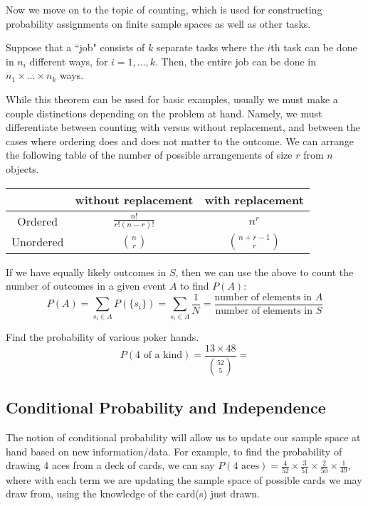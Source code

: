Now we move on to the topic of counting, which is used for constructing probability assignments on finite sample spaces as well as other tasks.

\begin{theorem}
    Suppose that a ``job" consists of $k$ separate tasks where the $i$th task can be done in $n_i$ different ways, for $i = 1, \dots, k$. Then, the entire job can be done in $n_1 \times \dots \times n_k$ ways.
\end{theorem}

While this theorem can be used for basic examples, usually we must make a couple distinctions depending on the problem at hand. Namely, we must differentiate between counting with versus without replacement, and between the cases where ordering does and does not matter to the outcome. We can arrange the following table of the number of possible arrangements of size $r$ from $n$ objects.
\begin{center}
\begin{tabular}{c|c|c}
 & without replacement & with replacement \\
\hline
Ordered & $\frac{n!}{r!(n-r)!}$ & $n^r$ \\
\hline
Unordered & $\binom{n}{r}$ & $\binom{n+r-1}{r}$ \\
\end{tabular}
\end{center}
\nextp

If we have equally likely outcomes in $S$, then we can use the above to count the number of outcomes in a given event $A$ to find $P(A)$:
\[
P(A) = \sum_{s_i \in A}{P(\{s_i\})} = \sum_{s_i \in A}{\frac{1}{N}} = \frac{\text{number of elements in } A}{\text{number of elements in } S}
\]

\begin{example}
    Find the probability of various poker hands.
    \[
    P(\text{4 of a kind}) = \frac{13 \times 48}{\binom{52}{5}} = 
    \]
\end{example}
\bigskip


\subsection*{Conditional Probability and Independence}
The notion of conditional probability will allow us to update our sample space at hand based on new information/data. For example, to find the probability of drawing 4 aces from a deck of cards, we can say $P(4 \text{ aces}) = \frac{4}{52} \times \frac{3}{51} \times \frac{2}{50} \times \frac{1}{49}$, where with each term we are updating the sample space of possible cards we may draw from, using the knowledge of the card(s) just drawn.


